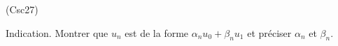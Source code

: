 \begin{tiny}(Csc27)\end{tiny} Indication. Montrer que $u_n$ est de la forme $\alpha_n u_0 + \beta_n u_1$ et préciser $\alpha_n$ et $\beta_n$. 